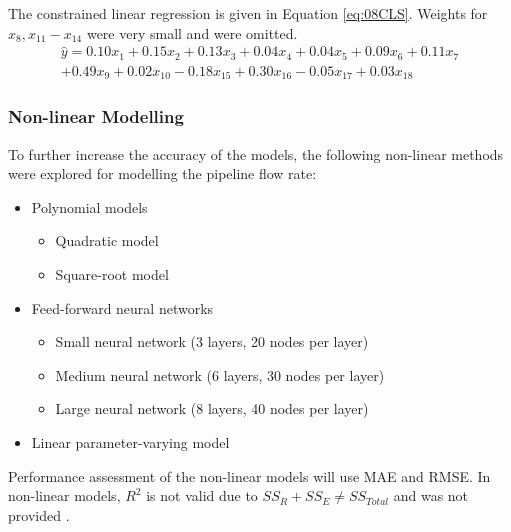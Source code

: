 The constrained linear regression is given in Equation \ref{eq:08CLS}.  Weights for $x_{8}, x_{11} - x_{14}$ were very small and were omitted.
\begin{multline}
    \hat{y} = 0.10x_1 + 0.15x_2 + 0.13x_3 + 0.04x_4 + 0.04x_5 + 0.09x_6 + 0.11x_7 \\
    + 0.49x_9 + 0.02x_{10}  - 0.18x_{15} + 0.30x_{16} - 0.05x_{17} + 0.03x_{18}
    \label{eq:08CLS}
\end{multline}

\subsubsection{Non-linear Modelling}
To further increase the accuracy of the models, the following non-linear methods were explored for modelling the pipeline flow rate:
\begin{itemize}
    \item Polynomial models
    \begin{itemize}
        \item Quadratic model
        \item Square-root model
    \end{itemize}
    \item Feed-forward neural networks
    \begin{itemize}
        \item Small neural network (3 layers, 20 nodes per layer)
        \item Medium neural network (6 layers, 30 nodes per layer)
        \item Large neural network (8 layers, 40 nodes per layer)
    \end{itemize}
    \item Linear parameter-varying model
\end{itemize}

Performance assessment of the non-linear models will use MAE and RMSE. In non-linear models, $R^2$ is not valid due to $SS_R + SS_E \neq SS_{Total}$ and was not provided \cite{generic_stats}.

